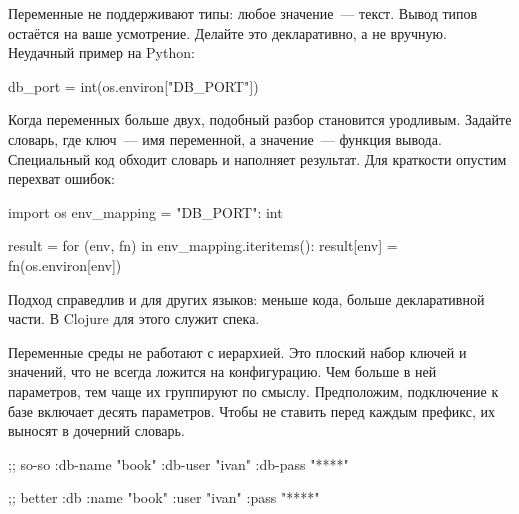 
Переменные не поддерживают типы: любое значение~--- текст. Вывод типов остаётся
на ваше усмотрение. Делайте это декларативно, а не вручную. Неудачный пример на
Python:


\begin{english}
  \begin{python}
db_port = int(os.environ["DB_PORT"])
  \end{python}
\end{english}

Когда переменных больше двух, подобный разбор становится уродливым. Задайте
словарь, где ключ~--- имя переменной, а значение~--- функция вывода. Специальный
код обходит словарь и наполняет результат. Для краткости опустим перехват
ошибок:

\begin{english}
  \begin{python}
import os
env_mapping = {"DB_PORT": int}

result = {}
for (env, fn) in env_mapping.iteritems():
    result[env] = fn(os.environ[env])
  \end{python}
\end{english}

Подход справедлив и для других языков: меньше кода, больше декларативной
части. В Clojure для этого служит спека.

Переменные среды не работают с иерархией. Это плоский набор ключей и значений,
что не всегда ложится на конфигурацию. Чем больше в ней параметров, тем чаще их
группируют по смыслу. Предположим, подключение к базе включает десять
параметров. Чтобы не ставить перед каждым префикс, их выносят в дочерний
словарь.


\ifx\DEVICETYPE\MOBILE

\begin{english}
  \begin{clojure}
;; so-so
{:db-name "book"
 :db-user "ivan"
 :db-pass "****"}
  \end{clojure}

\splitter

  \begin{clojure}
;; better
{:db {:name "book"
      :user "ivan"
      :pass "****"}}
  \end{clojure}
\end{english}

